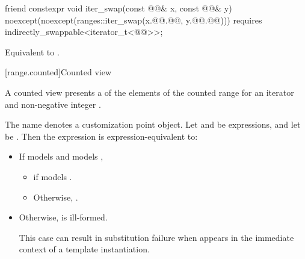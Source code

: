 %
\begin{itemdecl}
friend constexpr void iter_swap(const @@& x, const @@& y)
  noexcept(noexcept(ranges::iter_swap(x.@@.@@, y.@@.@@)))
  requires indirectly_swappable<iterator_t<@@>>;
\end{itemdecl}

\begin{itemdescr}
\pnum
\effects
Equivalent to
.
\end{itemdescr}

[range.counted]{Counted view}

\pnum
{}%
A counted view presents a  of the elements
of the counted range 
for an iterator  and non-negative integer .

\pnum
The name  denotes a
customization point object.
Let  and  be expressions,
and let  be .
Then the expression  is expression-equivalent to:
\begin{itemize}
\item If  models  and
   models ,
  \begin{itemize}
  \item {}
    if  models .
  \item Otherwise,
    .
\end{itemize}

\item Otherwise,  is ill-formed.
  \begin{note}
  This case can result in substitution failure when 
  appears in the immediate context of a template instantiation.
  \end{note}
\end{itemize}

